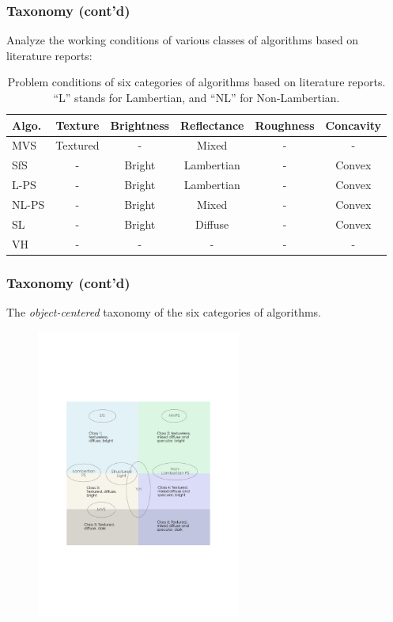 \documentclass{beamer}
\begin{document}
\begin{frame}
\frametitle{Taxonomy (cont'd)}
Analyze the working conditions of various classes of algorithms based on literature reports:
\begin{table}
\begin{tabular}{l|ccccc}
\toprule
Algo. & Texture & Brightness & Reflectance & Roughness & Concavity\\
\midrule
MVS & Textured & - & Mixed & - & -\\
SfS & - & Bright & Lambertian & - & Convex\\
L-PS &  - & Bright & Lambertian & - & Convex\\
NL-PS & - & Bright & Mixed & - & Convex\\
SL & - & Bright & Diffuse & - & Convex\\
VH & - & - & - & - & -\\
\bottomrule
\end{tabular}
\caption{Problem conditions of six categories of algorithms based on literature reports. ``L'' stands for Lambertian, and ``NL'' for Non-Lambertian.}
\end{table}

\end{frame}

\begin{frame}
\frametitle{Taxonomy (cont'd)}
The \textit{object-centered} taxonomy of the six categories of algorithms.
\begin{figure}[!htbp]
\includegraphics[width=0.6\textwidth]{taxo/six_class}
\end{figure}
\end{frame}
\end{document}
